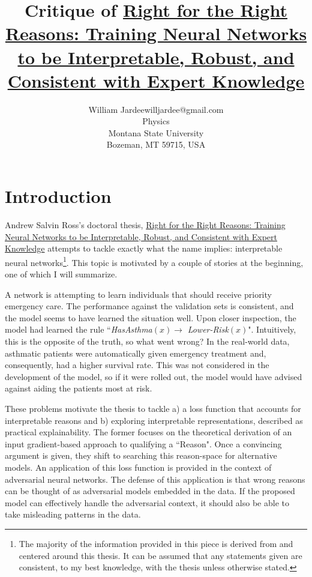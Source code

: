 \documentclass[twoside,11pt]{article}
\begin{document}
\title{Critique of \ul{Right for the Right Reasons: Training Neural Networks to be Interpretable, Robust, and Consistent with Expert Knowledge}}

\author{\name William Jardee\email willjardee@gmail.com \\
       \addr Physics\\
       Montana State University\\
       Bozeman, MT 59715, USA
       }
\editor{\,}

\maketitle

\begin{abstract}%
\end{abstract}
 
\section{Introduction}
Andrew Salvin Ross's doctoral thesis, \ul{Right for the Right Reasons: Training Neural Networks to be Interpretable, Robust, and Consistent with Expert Knowledge} attempts to tackle exactly what the name implies: interpretable neural networks\footnote{The majority of the information provided in this piece is derived from and centered around this thesis. It can be assumed that any statements given are consistent, to my best knowledge, with the thesis unless otherwise stated.}. This topic is motivated by a couple of stories at the beginning, one of which I will summarize. 

A network is attempting to learn individuals that should receive priority emergency care. The performance against the validation sets is consistent, and the model seems to have learned the situation well. Upon closer inspection, the model had learned the rule ``\textit{HasAsthma}$(x) \rightarrow$ \textit{Lower-Risk}$(x)$". Intuitively, this is the opposite of the truth, so what went wrong? In the real-world data, asthmatic patients were automatically given emergency treatment and, consequently, had a higher survival rate. This was not considered in the development of the model, so if it were rolled out, the model would have advised against aiding the patients most at risk. 

These problems motivate the thesis to tackle a) a loss function that accounts for interpretable reasons and b) exploring interpretable representations, described as practical explainability. The former focuses on the theoretical derivation of an input gradient-based approach to qualifying a ``Reason". Once a convincing argument is given, they shift to searching this reason-space for alternative models. An application of this loss function is provided in the context of adversarial neural networks. The defense of this application is that wrong reasons can be thought of as adversarial models embedded in the data. If the proposed model can effectively handle the adversarial context, it should also be able to take misleading patterns in the data.
\end{document}
